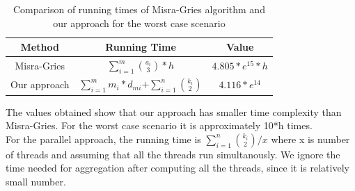 \begin{table}[ht]
\caption{Comparison of running times of Misra-Gries algorithm and our approach for the worst case scenario}
\centering
\begin{tabular}{c c c}
\hline\hline
Method & Running Time & Value \\ [0.5ex]
\hline
Misra-Gries&\(\sum\limits_{i=1}^m{a_i \choose 3}*h\)&\(4.805*e^{15} * h\)\\
Our approach&\(\sum\limits_{i=1}^m{m_i * d_{mi}}\)+\(\sum\limits_{i=1}^n{k_i \choose 2}\)&\(4.116*e^{14}\)\\
\hline
\end{tabular}
\label{comparison}
\end{table}
The values obtained show that our approach has smaller time complexity than Misra-Gries. For the worst case scenario it is approximately 10*h times.
\\
For the parallel approach, the running time is \(\sum\limits_{i=1}^n{k_i \choose 2}/x\) where x is number of threads and assuming that all the threads run simultanously. We ignore the time needed for aggregation after computing all the threads, since it is relatively small number.
